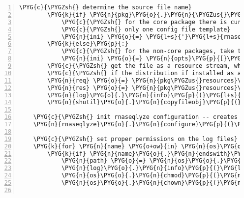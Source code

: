 \begin{Verbatim}[commandchars=\\\{\},numbers=left,firstnumber=1,stepnumber=5]
        \PYG{c}{\PYGZsh{} determine the source file name}
        \PYG{k}{if} \PYG{n}{pkg}\PYG{o}{.}\PYG{n}{\PYGZus{}\PYGZus{}name\PYGZus{}\PYGZus{}} \PYG{o}{==} \PYG{l+s}{"}\PYG{l+s}{rnaseqlyze}\PYG{l+s}{"}\PYG{p}{:}
            \PYG{c}{\PYGZsh{} for the core package there is currently}
            \PYG{c}{\PYGZsh{} only one config file template}
            \PYG{n}{ini} \PYG{o}{=} \PYG{l+s}{'}\PYG{l+s}{rnaseqlyze.ini}\PYG{l+s}{'}
        \PYG{k}{else}\PYG{p}{:}
            \PYG{c}{\PYGZsh{} for the non-core packages, take the desired version}
            \PYG{n}{ini} \PYG{o}{=} \PYG{n}{opts}\PYG{p}{[}\PYG{l+s}{'}\PYG{l+s}{--development}\PYG{l+s}{'}\PYG{p}{]} \PYG{o+ow}{and} \PYG{l+s}{"}\PYG{l+s}{development.ini}\PYG{l+s}{"} \PYG{o+ow}{or} \PYG{l+s}{"}\PYG{l+s}{production.ini}\PYG{l+s}{"}
        \PYG{c}{\PYGZsh{} get the file as a resource stream, which works even}
        \PYG{c}{\PYGZsh{} if the distribution if installed as a zipped .egg}
        \PYG{n}{req} \PYG{o}{=} \PYG{n}{pkg\PYGZus{}resources}\PYG{o}{.}\PYG{n}{Requirement}\PYG{o}{.}\PYG{n}{parse}\PYG{p}{(}\PYG{n}{pkg}\PYG{o}{.}\PYG{n}{project\PYGZus{}name}\PYG{p}{)}
        \PYG{n}{res} \PYG{o}{=} \PYG{n}{pkg\PYGZus{}resources}\PYG{o}{.}\PYG{n}{resource\PYGZus{}stream}\PYG{p}{(}\PYG{n}{req}\PYG{p}{,} \PYG{n}{ini}\PYG{p}{)}
        \PYG{n}{log}\PYG{o}{.}\PYG{n}{info}\PYG{p}{(}\PYG{l+s}{"}\PYG{l+s}{creating config file }\PYG{l+s}{'}\PYG{l+s+si}{\PYGZpc{}s}\PYG{l+s}{'}\PYG{l+s}{"} \PYG{o}{\PYGZpc{}} \PYG{n}{conf\PYGZus{}name}\PYG{p}{)}
        \PYG{n}{shutil}\PYG{o}{.}\PYG{n}{copyfileobj}\PYG{p}{(}\PYG{n}{res}\PYG{p}{,} \PYG{n+nb}{open}\PYG{p}{(}\PYG{n}{conf\PYGZus{}path}\PYG{p}{,} \PYG{l+s}{"}\PYG{l+s}{w}\PYG{l+s}{"}\PYG{p}{)}\PYG{p}{)}

    \PYG{c}{\PYGZsh{} init rnaseqlyze configuration -- creates all .log files}
    \PYG{n}{rnaseqlyze}\PYG{o}{.}\PYG{n}{configure}\PYG{p}{(}\PYG{n}{workdir}\PYG{p}{)}

    \PYG{c}{\PYGZsh{} set proper permissions on the log files}
    \PYG{k}{for} \PYG{n}{name} \PYG{o+ow}{in} \PYG{n}{os}\PYG{o}{.}\PYG{n}{listdir}\PYG{p}{(}\PYG{n}{workdir}\PYG{p}{)}\PYG{p}{:}
        \PYG{k}{if} \PYG{n}{name}\PYG{o}{.}\PYG{n}{endswith}\PYG{p}{(}\PYG{l+s}{'}\PYG{l+s}{.log}\PYG{l+s}{'}\PYG{p}{)}\PYG{p}{:}
            \PYG{n}{path} \PYG{o}{=} \PYG{n}{os}\PYG{o}{.}\PYG{n}{path}\PYG{o}{.}\PYG{n}{join}\PYG{p}{(}\PYG{n}{workdir}\PYG{p}{,} \PYG{n}{name}\PYG{p}{)}
            \PYG{n}{log}\PYG{o}{.}\PYG{n}{info}\PYG{p}{(}\PYG{l+s}{"}\PYG{l+s}{adjusting permissions on }\PYG{l+s}{'}\PYG{l+s+si}{\PYGZpc{}s}\PYG{l+s}{'}\PYG{l+s}{"} \PYG{o}{\PYGZpc{}} \PYG{n}{name}\PYG{p}{)}
            \PYG{n}{os}\PYG{o}{.}\PYG{n}{chmod}\PYG{p}{(}\PYG{n}{path}\PYG{p}{,} \PYG{l+m+mo}{0664}\PYG{p}{)}
            \PYG{n}{os}\PYG{o}{.}\PYG{n}{chown}\PYG{p}{(}\PYG{n}{path}\PYG{p}{,} \PYG{o}{-}\PYG{l+m+mi}{1}\PYG{p}{,} \PYG{n}{grp}\PYG{o}{.}\PYG{n}{getgrnam}\PYG{p}{(}\PYG{n}{rnaseqlyze}\PYG{o}{.}\PYG{n}{group}\PYG{p}{)}\PYG{o}{.}\PYG{n}{gr\PYGZus{}gid}\PYG{p}{)}


\end{Verbatim}
